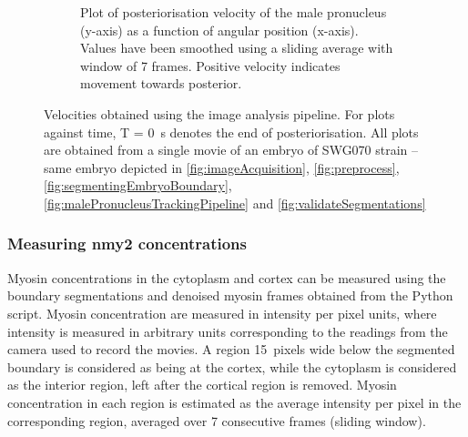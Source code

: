\begin{figure}[p]
\begin{subfigure}[t]{0.45\textwidth}
    \caption{Plot of posteriorisation velocity of the male pronucleus (y-axis) as a function of angular position (x-axis). Values have been smoothed using a sliding average with window of \num{7} frames. Positive velocity indicates movement towards posterior.} 
    \label{subfig:malePronucleusTrackingVelocities-postVelVsAngleSmooth}
\end{subfigure}

\caption[Image analysis: Trajectory of male pronucleus (velocities)]{Velocities obtained using the image analysis pipeline. For plots against time, T = \SI{0}{\second} denotes the end of posteriorisation. All plots are obtained from a single movie of an embryo of SWG070 strain -- same embryo depicted in \autoref{fig:imageAcquisition}, \autoref{fig:preprocess}, \autoref{fig:segmentingEmbryoBoundary}, \autoref{fig:malePronucleusTrackingPipeline} and \autoref{fig:validateSegmentations}}
\label{fig:malePronucleusTrackingVelocities}
\end{figure}

\subsubsection{Measuring \ac{nmy2} concentrations}\label{subsubsec:myosinConc}
Myosin concentrations in the cytoplasm and cortex can be measured using the boundary segmentations and denoised myosin frames obtained from the Python script. Myosin concentration are measured in intensity per pixel units, where intensity is measured in arbitrary units corresponding to the readings from the camera used to record the movies. A region \SI{15}{pixels} wide below the segmented boundary is considered as being at the cortex, while the cytoplasm is considered as the interior region, left after the cortical region is removed. Myosin concentration in each region is estimated as the average intensity per pixel in the corresponding region, averaged over \num{7} consecutive frames (sliding window).

